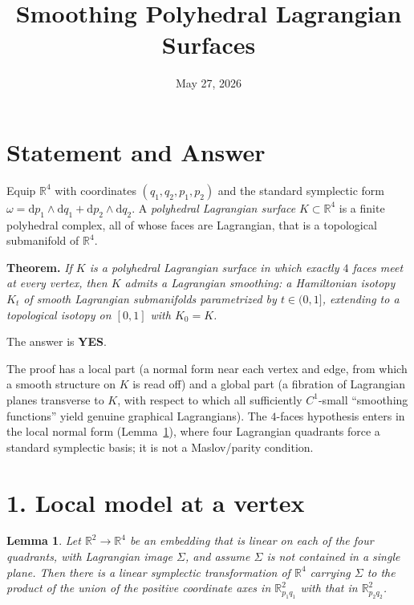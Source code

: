 \documentclass[11pt]{article}
\title{Smoothing Polyhedral Lagrangian Surfaces}
\author{}
\date{May 27, 2026}
\newcommand{\R}{\mathbb{R}}
\newcommand{\dd}{\mathrm d}
\newtheorem{lemma}{Lemma}
\theoremstyle{definition}
\begin{document}
\maketitle

\section*{Statement and Answer}

Equip $\R^4$ with coordinates $(q_1,q_2,p_1,p_2)$ and the standard symplectic
form $\omega=\dd p_1\wedge \dd q_1+\dd p_2\wedge \dd q_2$. A \emph{polyhedral
Lagrangian surface} $K\subset\R^4$ is a finite polyhedral complex, all of whose
faces are Lagrangian, that is a topological submanifold of $\R^4$.

\medskip
\noindent\textbf{Theorem.} \emph{If $K$ is a polyhedral Lagrangian surface in
which exactly $4$ faces meet at every vertex, then $K$ admits a Lagrangian
smoothing: a Hamiltonian isotopy $K_t$ of smooth Lagrangian submanifolds
parametrized by $t\in(0,1]$, extending to a topological isotopy on $[0,1]$ with
$K_0=K$.}

\medskip
\noindent The answer is \textbf{YES}.

\medskip
The proof has a local part (a normal form near each vertex and edge, from which
a smooth structure on $K$ is read off) and a global part (a fibration of
Lagrangian planes transverse to $K$, with respect to which all sufficiently
$C^1$-small ``smoothing functions'' yield genuine graphical Lagrangians). The
$4$-faces hypothesis enters in the local normal form (Lemma~\ref{lem:linear}),
where four Lagrangian quadrants force a standard symplectic basis; it is not a
Maslov/parity condition.

\section*{1. Local model at a vertex}

\begin{lemma}\label{lem:linear}
Let $\R^2\to\R^4$ be an embedding that is linear on each of the four quadrants,
with Lagrangian image $\Sigma$, and assume $\Sigma$ is not contained in a single
plane. Then there is a linear symplectic transformation of $\R^4$ carrying
$\Sigma$ to the product of the union of the positive coordinate axes in
$\R^2_{p_1q_1}$ with that in $\R^2_{p_2q_2}$.
\end{lemma}
\end{document}

